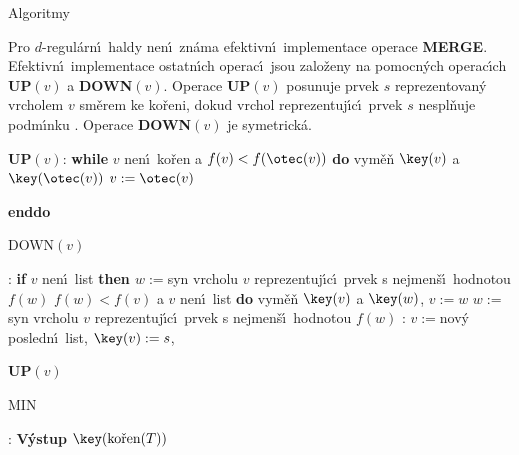\documentclass[a4paper,12pt]{article}
\begin{document}
\head
Algoritmy
\endhead

\flushpar Pro $d$-regul\'arn\'\i\ haldy nen\'\i\ zn\'ama efektivn\'\i\ implementace operace 
{\bf MERGE}.  Efektivn\'\i\ implementace 
ostatn\'\i ch operac\'\i\ jsou zalo\v zeny na pomocn\'ych 
operac\'\i ch {\bf UP$(v)$} a {\bf DOWN$(v)$}.  Ope\-race {\bf UP$
(v)$} posunuje 
prvek $s$ reprezentovan\'y vrcholem $v$ sm\v erem ke ko\v reni, 
dokud vrchol reprezentuj\'\i c\'\i\ prvek $s$ nespl\v nu\-je podm\'\i nku 
.  Operace {\bf DOWN$(v)$} je symetrick\'a.  
\bigskip
 

{\bf UP$(v)$}:\newline 
{\bf while} $v$ nen\'\i\ ko\v ren a $f(v)<f(\otec(v))$ {\bf do\newline 
\phantom{{\rm ---}}}vym\v e\v n $\key(v)$ a $\key(\otec(v))$\newline 
\phantom{---}$v:=\otec(v)$\newline 
{\bf enddo
\bigskip

DOWN$(v)$}:\newline 
{\bf if} $v$ nen\'\i\ list {\bf then\newline 
\phantom{{{\rm ---}}}$w:=$}syn vrcholu $v$ reprezentuj\'\i c\'\i\ prvek s nejmen\v s\'\i\ 
hodnotou $f(w)$\newline 
\phantom{---}{\bf while} $f(w)<f(v)$ a $v$ nen\'\i\ list {\bf do\newline 
\phantom{{\rm ------}}}vym\v e\v n $\key(v)$ a $\key(w)$, $v:=w$\newline 
\phantom{------}$w:=$syn vrcholu $v$ reprezentuj\'\i c\'\i\ prvek s nejmen\v s\'\i\ 
hodnotou $f(w)$\newline 
\phantom{---}{\bf enddo\newline 
endif
\bigskip

INSERT$(s)$}:\newline 
$v:=$nov\'y posledn\'\i\ list, $\key(v):=s$, {\bf UP$(v)$
\bigskip

MIN}:\newline 
{\bf V\'ystup} $\key(\text{\rm ko\v ren}(T))$
\bigskip
\end{document}
